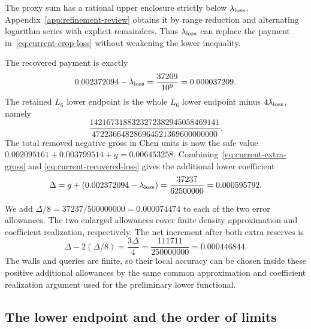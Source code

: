 The proxy sum has a rational upper enclosure strictly below
$\lambda_{\rm loss}$. Appendix~\ref{app:refinement-review} obtains it by range
reduction and alternating logarithm series with explicit remainders.
Thus $\lambda_{\rm loss}$ can replace the payment
in~\eqref{eq:current-crop-loss} without weakening the lower inequality.

The recovered payment is exactly
\begin{equation}
 0.002372094-\lambda_{\rm loss}=\frac{37209}{10^9}=0.000037209.
 \label{eq:current-recovered-loss}
\end{equation}
The retained $L_6$ lower endpoint is the whole $L_6$ lower
endpoint minus $4\lambda_{\rm loss}$, namely
\[
 \frac{1421673188323272382945058469141}
      {472236648286964521369600000000}.
\]
The total removed negative gross in Chen units is now the safe
value $0.002095161+0.003799514+g=0.006453258$.
Combining~\eqref{eq:current-extra-gross} and
\eqref{eq:current-recovered-loss} gives the additional lower coefficient
\begin{equation}
 \Delta=g+(0.002372094-\lambda_{\rm loss})
 =\frac{37237}{62500000}=0.000595792.
 \label{eq:current-refinement-delta}
\end{equation}

We add $\Delta/8=37237/500000000=0.000074474$
to each of the two error allowances.  The two enlarged allowances cover finite density approximation and
coefficient realization, respectively.
The net increment after both extra reserves is
\begin{equation}
 \Delta-2(\Delta/8)=\frac{3\Delta}{4}
                  =\frac{111711}{250000000}=0.000446844.
 \label{eq:current-refinement-net}
\end{equation}
The walls and queries are finite, so their local accuracy
can be chosen inside these positive additional allowances by
the same common approximation and coefficient realization argument used
for the preliminary lower functional.

\subsection{The lower endpoint and the order of limits}
\label{sec:lower-limits}

